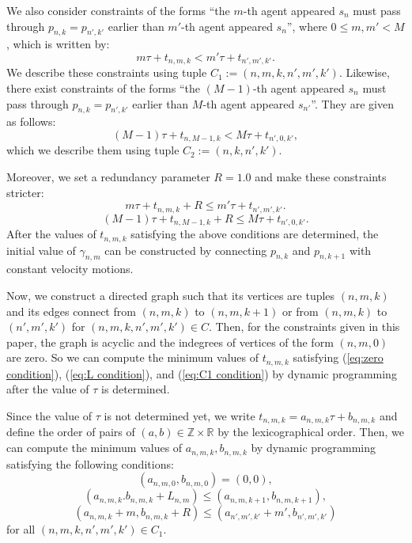 \documentclass[letterpaper]{article} %
\begin{document}
We also consider constraints of the forms ``the $m$-th agent appeared $s_n$ must pass through $p_{n,k}=p_{n',k'}$ earlier than $m'$-th agent appeared $s_n$'', where $0\leq m ,m'< M$, which is written by:
\begin{equation}
    m\tau+t_{n,m,k}< m'\tau+t_{n',m',k'}.
\end{equation}
We describe these constraints using tuple $C_1:=(n,m,k,n',m',k')$.
Likewise, there exist constraints of the forms ``the $(M-1)$-th agent appeared $s_n$ must pass through $p_{n,k}=p_{n',k'}$ earlier than $M$-th agent appeared $s_{n'}$''. They are given as follows:
\begin{equation}
    (M-1)\tau+t_{n,M-1,k}< M\tau+t_{n',0,k'},
\end{equation}
which we describe them using tuple $C_2:=(n,k,n',k')$.

Moreover, we set a redundancy parameter $R=1.0$ and make these constraints stricter:
\begin{equation}\label{eq:C1 condition}
    m\tau+t_{n,m,k}+R\leq m'\tau+t_{n',m',k'}.
\end{equation}
\begin{equation}\label{eq:C2 condition}
    (M-1)\tau+t_{n,M-1,k}+R\leq M\tau+t_{n',0,k'}.
\end{equation}
After the values of $t_{n,m,k}$ satisfying the above conditions are determined, the initial value of $\gamma_{n,m}$ can be constructed by connecting $p_{n,k}$ and $p_{n,k+1}$ with constant velocity motions.

Now, we construct a directed graph such that its vertices are tuples $(n,m,k)$ and its edges connect from $(n,m,k)$ to $(n,m,k+1)$ or from $(n,m,k)$ to $(n',m',k')$ for $(n,m,k,n',m',k')\in C$. Then, for the constraints given in this paper, the graph is acyclic and the indegrees of vertices of the form $(n,m,0)$ are zero. So we can compute the minimum values of $t_{n,m,k}$ satisfying (\ref{eq:zero condition}), (\ref{eq:L condition}), and (\ref{eq:C1 condition}) by dynamic programming after the value of $\tau$ is determined.

Since the value of $\tau$ is not determined yet, we write $t_{n,m,k}=a_{n,m,k}\tau + b_{n,m,k}$ and define the order of pairs of $(a,b)\in \mathbb{Z}\times\mathbb{R}$ by the lexicographical order. Then, we can compute the minimum values of $a_{n,m,k}, b_{n,m,k}$ by dynamic programming satisfying the following conditions:
\begin{equation}
    (a_{n,m,0},b_{n,m,0})=(0,0),
\end{equation}
\begin{equation}
    (a_{n,m,k}.b_{n,m,k}+L_{n,m})\leq (a_{n,m,k+1}, b_{n,m,k+1}),
\end{equation}
\begin{equation}
    (a_{n,m,k}+m, b_{n,m,k}+R) \leq (a_{n',m',k'}+m', b_{n',m',k'})
\end{equation}
for all $(n,m,k,n',m',k')\in C_1$.
\end{document}

